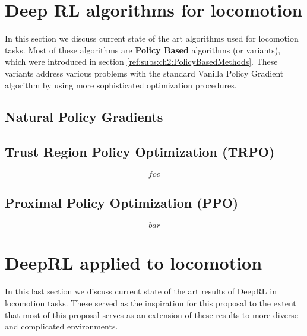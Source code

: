 \section{Deep RL algorithms for locomotion} \label{sec:ch3_deeprl_algorithms}

In this section we discuss current state of the art algorithms used for locomotion 
tasks. Most of these algorithms are \textbf{Policy Based} algorithms (or variants), 
which were introduced in section \ref{ref:subs:ch2:PolicyBasedMethods}. These
variants address various problems with the standard Vanilla Policy Gradient algorithm
by using more sophisticated optimization procedures.

\subsection{Natural Policy Gradients}



\subsection{Trust Region Policy Optimization (TRPO)}


\cite{TRPO}

\begin{equation}
    foo
\end{equation}

\subsection{Proximal Policy Optimization (PPO)}

\cite{PPO}

\begin{equation}
    bar
\end{equation}

\section{DeepRL applied to locomotion}

In this last section we discuss current state of the art results of DeepRL in
locomotion tasks. These served as the inspiration for this proposal to the extent
that most of this proposal serves as an extension of these results to more 
diverse and complicated environments.



